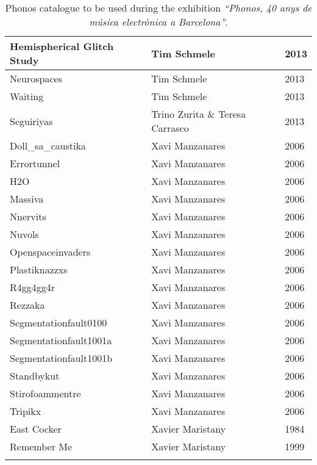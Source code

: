 \begin{center}
\begin{longtable}{| p{} | p{} | p{} |}
Hemispherical Glitch Study & Tim Schmele & 2013 \\ \hline 
Neurospaces & Tim Schmele & 2013 \\ \hline 
Waiting & Tim Schmele & 2013 \\ \hline 
Seguiriyas & Trino Zurita \& Teresa Carrasco & 2013 \\ \hline 
Doll\_sa\_caustika & Xavi Manzanares & 2006 \\ \hline 
Errortunnel & Xavi Manzanares & 2006 \\ \hline 
H2O & Xavi Manzanares & 2006 \\ \hline 
Massiva & Xavi Manzanares & 2006 \\ \hline 
Nnervits & Xavi Manzanares & 2006 \\ \hline 
Nuvols & Xavi Manzanares & 2006 \\ \hline 
Openspaceinvaders & Xavi Manzanares & 2006 \\ \hline 
Plastiknazzxs & Xavi Manzanares & 2006 \\ \hline 
R4gg4gg4r & Xavi Manzanares & 2006 \\ \hline 
Rezzaka & Xavi Manzanares & 2006 \\ \hline 
Segmentationfault0100 & Xavi Manzanares & 2006 \\ \hline 
Segmentationfault1001a & Xavi Manzanares & 2006 \\ \hline 
Segmentationfault1001b & Xavi Manzanares & 2006 \\ \hline 
Standbykut & Xavi Manzanares & 2006 \\ \hline 
Stirofoammentre & Xavi Manzanares & 2006 \\ \hline 
Tripikx & Xavi Manzanares & 2006 \\ \hline 
East Cocker & Xavier Maristany & 1984 \\ \hline 
Remember Me & Xavier Maristany & 1999 \\ \hline 
\caption[Phonos catalogue of songs]{Phonos catalogue to be used during the exhibition \textit{``Phonos, 40 anys de música electrònica a Barcelona''}.}
\label{table:phonosCatalogue}
\end{longtable}
\end{center}